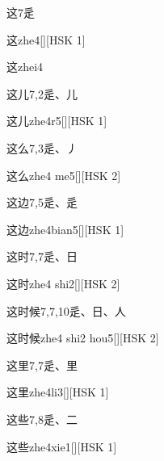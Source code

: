 \begin{entry}{这}{7}{⾡}
  \begin{phonetics}{这}{zhe4}[][HSK 1]
  \end{phonetics}
  \begin{phonetics}{这}{zhei4}
  \end{phonetics}
\end{entry}

\begin{entry}{这儿}{7,2}{⾡、⼉}
  \begin{phonetics}{这儿}{zhe4r5}[][HSK 1]
  \end{phonetics}
\end{entry}

\begin{entry}{这么}{7,3}{⾡、⼃}
  \begin{phonetics}{这么}{zhe4 me5}[][HSK 2]
  \end{phonetics}
\end{entry}

\begin{entry}{这边}{7,5}{⾡、⾡}
  \begin{phonetics}{这边}{zhe4bian5}[][HSK 1]
  \end{phonetics}
\end{entry}

\begin{entry}{这时}{7,7}{⾡、⽇}
  \begin{phonetics}{这时}{zhe4 shi2}[][HSK 2]
  \end{phonetics}
\end{entry}

\begin{entry}{这时候}{7,7,10}{⾡、⽇、⼈}
  \begin{phonetics}{这时候}{zhe4 shi2 hou5}[][HSK 2]
  \end{phonetics}
\end{entry}

\begin{entry}{这里}{7,7}{⾡、⾥}
  \begin{phonetics}{这里}{zhe4li3}[][HSK 1]
  \end{phonetics}
\end{entry}

\begin{entry}{这些}{7,8}{⾡、⼆}
  \begin{phonetics}{这些}{zhe4xie1}[][HSK 1]
  \end{phonetics}
\end{entry}

